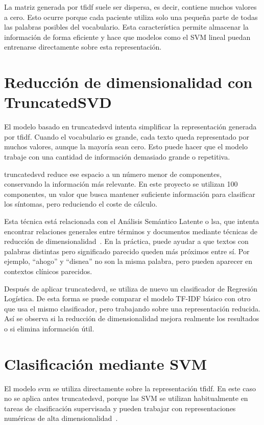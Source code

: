 La matriz generada por \gls{tfidf} suele ser dispersa, es decir, contiene muchos valores a cero. Esto ocurre porque cada paciente utiliza solo una pequeña parte de todas las palabras posibles del vocabulario. Esta característica permite almacenar la información de forma eficiente y hace que modelos como el SVM lineal puedan entrenarse directamente sobre esta representación.

\section{Reducción de dimensionalidad con TruncatedSVD}

El modelo basado en \gls{truncatedsvd} intenta simplificar la representación generada por \gls{tfidf}. Cuando el vocabulario es grande, cada texto queda representado por muchos valores, aunque la mayoría sean cero. Esto puede hacer que el modelo trabaje con una cantidad de información demasiado grande o repetitiva.

\gls{truncatedsvd} reduce ese espacio a un número menor de componentes, conservando la información más relevante. En este proyecto se utilizan 100 componentes, un valor que busca mantener suficiente información para clasificar los síntomas, pero reduciendo el coste de cálculo.

Esta técnica está relacionada con el Análisis Semántico Latente o \gls{lsa}, que intenta encontrar relaciones generales entre términos y documentos mediante técnicas de reducción de dimensionalidad~\cite{ibm_lsa}. En la práctica, puede ayudar a que textos con palabras distintas pero significado parecido queden más próximos entre sí. Por ejemplo, ``ahogo'' y ``disnea'' no son la misma palabra, pero pueden aparecer en contextos clínicos parecidos.

Después de aplicar \gls{truncatedsvd}, se utiliza de nuevo un clasificador de Regresión Logística. De esta forma se puede comparar el modelo TF-IDF básico con otro que usa el mismo clasificador, pero trabajando sobre una representación reducida. Así se observa si la reducción de dimensionalidad mejora realmente los resultados o si elimina información útil.

\section{Clasificación mediante SVM}

El modelo \gls{svm} se utiliza directamente sobre la representación \gls{tfidf}. En este caso no se aplica antes \gls{truncatedsvd}, porque las SVM se utilizan habitualmente en tareas de clasificación supervisada y pueden trabajar con representaciones numéricas de alta dimensionalidad~\cite{ibm_svm, ibm_clasificacion}.

